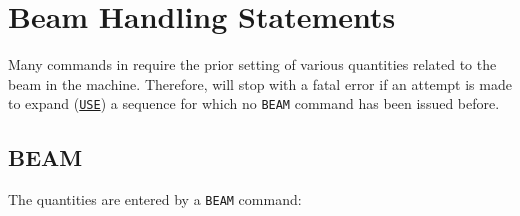 \chapter{Beam Handling Statements} 
\label{chap:beam}

Many commands in \mad require the prior setting of various quantities related
to the beam in the machine. Therefore, \mad will stop with a fatal
error if an attempt is made to expand (\hyperref[sec:use]{\texttt{USE}}) a sequence 
for which no \texttt{BEAM} command has been issued before.



\section{BEAM}
\label{sec:beam}

The quantities are entered by a \texttt{BEAM} command: 

